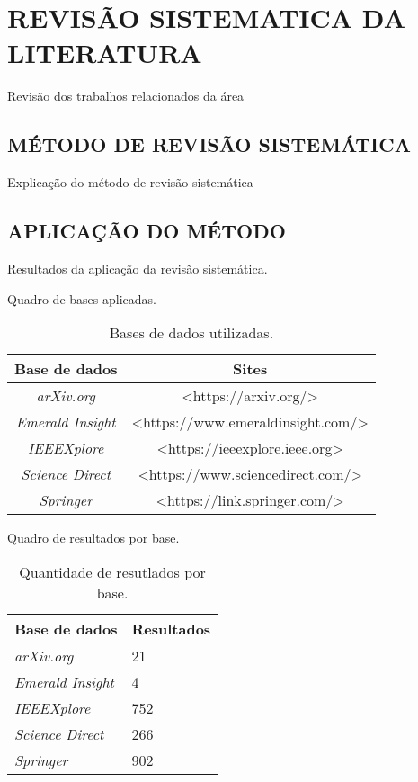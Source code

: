 
\chapter{REVISÃO SISTEMATICA DA LITERATURA}
\label{chap:revisaoSistematica}
Revisão dos trabalhos relacionados da área

\section{MÉTODO DE REVISÃO SISTEMÁTICA}
\label{sec:metodoRevisao}
Explicação do método de revisão sistemática

\section{APLICAÇÃO DO MÉTODO}
\label{sec:aplicacaoRevisao}
Resultados da aplicação da revisão sistemática.

Quadro de bases aplicadas.
\begin{table}[]
	\centering
	\caption{Bases de dados utilizadas.}
	\label{qua:baseDadosl}
	\begin{tabular}{|c|c|}
		\hline
		\textbf{Base de dados} & \textbf{Sites}                                           \\ \hline
		\textit{arXiv.org}              & \textless{}https://arxiv.org/\textgreater{}              \\ \hline
		\textit{Emerald Insight}        & \textless{}https://www.emeraldinsight.com/\textgreater{} \\ \hline
		\textit{IEEEXplore}             & \textless{}https://ieeexplore.ieee.org\textgreater{}     \\ \hline
		\textit{Science Direct}         & \textless{}https://www.sciencedirect.com/\textgreater{}  \\ \hline
		\textit{Springer}               & \textless{}https://link.springer.com/\textgreater{}      \\ \hline
	\end{tabular}
\end{table}

Quadro de resultados por base.
\begin{table}[]
	\centering
	\caption{Quantidade de resutlados por base.}
	\label{tab:resultadosBase}
	\begin{tabular}{l|l}
		\hline
		\textbf{Base de dados} & \textbf{Resultados} \\ \hline
		\textit{arXiv.org}              & 21                   \\
		\textit{Emerald Insight}        & 4                   \\
		\textit{IEEEXplore}             & 752                   \\
		\textit{Science Direct}         & 266                   \\
		\textit{Springer}               & 902                   \\ \hline
	\end{tabular}
\end{table}